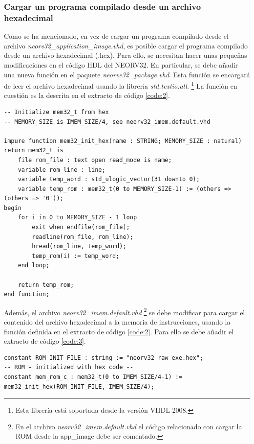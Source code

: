 \subsubsection{Cargar un programa compilado desde un archivo hexadecimal}

Como se ha mencionado, en vez de cargar un programa compilado desde el archivo \textit{neorv32\_application\_image.vhd}, es posible cargar el programa compilado desde un archivo hexadecimal (.hex).
Para ello, se necesitan hacer unas pequeñas modificaciones en el código HDL del NEORV32.
En particular, se debe añadir una nueva función en el paquete \textit{neorve32\_package.vhd}.
Esta función se encargará de leer el archivo hexadecimal usando la librería \textit{std.textio.all}. \footnote{Esta librería está soportada desde la versión VHDL 2008.}
La función en cuestión es la descrita en el extracto de código \ref{code:2}.

\begin{listing}[h!]
\begin{verbatim}
-- Initialize mem32_t from hex
-- MEMORY_SIZE is IMEM_SIZE/4, see neorv32_imem.default.vhd

impure function mem32_init_hex(name : STRING; MEMORY_SIZE : natural) return mem32_t is
    file rom_file : text open read_mode is name;
    variable rom_line : line;
    variable temp_word : std_ulogic_vector(31 downto 0);
    variable temp_rom : mem32_t(0 to MEMORY_SIZE-1) := (others => (others => '0'));
begin
    for i in 0 to MEMORY_SIZE - 1 loop
        exit when endfile(rom_file);
        readline(rom_file, rom_line);
        hread(rom_line, temp_word);
        temp_rom(i) := temp_word;
    end loop;

    return temp_rom;
end function;
\end{verbatim}
\caption{Función a añadir al \textit{neorve32\_package.vhd} para leer un software compilado en formato hexadecimal.}
\label{code:2}
\end{listing}

Además, el archivo \textit{neorv32\_imem.default.vhd} \footnote{En el archivo \textit{neorv32\_imem.default.vhd} el código relacionado con cargar la ROM desde la app\_image debe ser comentado.} se debe modificar para cargar el contenido del archivo hexadecimal a la memoria de instrucciones, usando la función definida en el extracto de código \ref{code:2}.
Para ello se debe añadir el extracto de código \ref{code:3}.

\begin{listing}[h!]
\begin{verbatim}
constant ROM_INIT_FILE : string := "neorv32_raw_exe.hex";
-- ROM - initialized with hex code --
constant mem_rom_c : mem32_t(0 to IMEM_SIZE/4-1) := mem32_init_hex(ROM_INIT_FILE, IMEM_SIZE/4);
\end{verbatim}
\caption{Modificación del archivo \textit{neorv32\_imem.default.vhd} para cargar la IMEM mediante la función descrita en el extracto de código \ref{code:2}.}
\label{code:3}
\end{listing}

